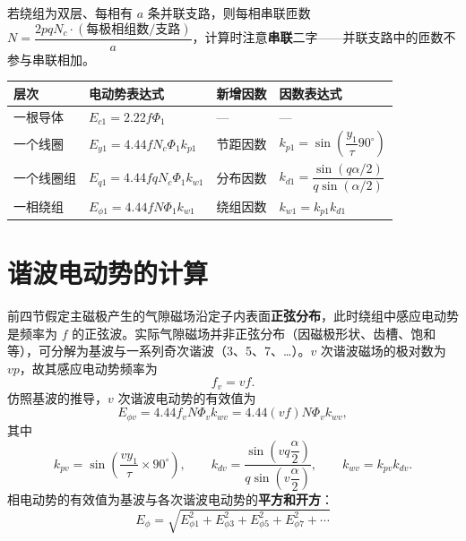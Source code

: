 
若绕组为双层、每相有 $a$ 条并联支路，则每相串联匝数 $N=\dfrac{2pqN_c\cdot(\text{每极相组数}/\text{支路})}{a}$，计算时注意\textbf{串联}二字——并联支路中的匝数不参与串联相加。

\begin{center}
\begin{tabular}{@{}llll@{}}
\toprule
层次 & 电动势表达式 & 新增因数 & 因数表达式 \\
\midrule
一根导体 & $E_{c1}=2.22f\Phi_1$ & — & — \\
一个线圈 & $E_{y1}=4.44fN_c\Phi_1k_{p1}$ & 节距因数 & $k_{p1}=\sin\left(\dfrac{y_1}{\tau}90^\circ\right)$ \\
一个线圈组 & $E_{q1}=4.44fqN_c\Phi_1k_{w1}$ & 分布因数 & $k_{d1}=\dfrac{\sin(q\alpha/2)}{q\sin(\alpha/2)}$ \\
一相绕组 & $E_{\phi1}=4.44fN\Phi_1k_{w1}$ & 绕组因数 & $k_{w1}=k_{p1}k_{d1}$ \\
\bottomrule
\end{tabular}
\end{center}


\section{谐波电动势的计算}

前四节假定主磁极产生的气隙磁场沿定子内表面\textbf{正弦分布}，此时绕组中感应电动势是频率为 $f$ 的正弦波。实际气隙磁场并非正弦分布（因磁极形状、齿槽、饱和等），可分解为基波与一系列奇次谐波（3、5、7、…）。$v$ 次谐波磁场的极对数为 $vp$，故其感应电动势频率为
\begin{equation}
f_v=vf .
\end{equation}
仿照基波的推导，$v$ 次谐波电动势的有效值为
\begin{equation}
E_{\phi v}=4.44f_vN\Phi_vk_{wv}=4.44(vf)N\Phi_vk_{wv},
\end{equation}
其中
\begin{equation}
k_{pv}=\sin\left(\frac{vy_1}{\tau}\times90^\circ\right),\qquad
k_{dv}=\frac{\sin\left(vq\dfrac{\alpha}{2}\right)}{q\sin\left(v\dfrac{\alpha}{2}\right)},\qquad
k_{wv}=k_{pv}k_{dv}.
\end{equation}
相电动势的有效值为基波与各次谐波电动势的\textbf{平方和开方}：
\begin{equation}
E_\phi=\sqrt{E_{\phi1}^{2}+E_{\phi3}^{2}+E_{\phi5}^{2}+E_{\phi7}^{2}+\cdots}
\end{equation}

